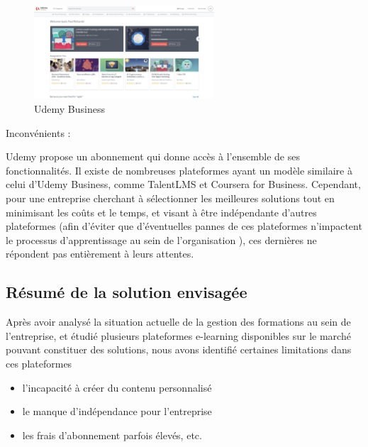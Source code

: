 \documentclass{article}
\begin{document}
\vspace{0.3cm}

\begin{figure}[H]
  \centering
  \includegraphics[width=0.6\textwidth]{udemy-business.jpg}
  \caption{Udemy Business}
  \label{fig:Udemy-Business}
\end{figure}

\vspace{0.3cm}

\noindent Inconvénients :

\vspace{0.3cm}

Udemy propose un abonnement qui donne accès à l'ensemble de ses fonctionnalités. Il existe de nombreuses plateformes ayant un modèle similaire à celui d'Udemy Business, comme TalentLMS et Coursera for Business. Cependant, pour une entreprise cherchant à sélectionner les meilleures solutions tout en minimisant les coûts et le temps, et visant à être indépendante d'autres plateformes (afin d'éviter que d'éventuelles pannes de ces plateformes n'impactent le processus d'apprentissage au sein de l'organisation ), ces dernières ne répondent pas entièrement à leurs attentes.


\subsection{Résumé de la solution envisagée}

\vspace{0.5cm}

\hspace*{2em}Après avoir analysé la situation actuelle de la gestion des formations au sein de l’entreprise, et étudié plusieurs plateformes e-learning disponibles sur le marché pouvant constituer des solutions, nous avons identifié certaines limitations dans ces plateformes
\begin{itemize}
    \item l’incapacité à créer du contenu personnalisé
    \item le manque d’indépendance pour l’entreprise
    \item les frais d’abonnement parfois élevés, etc.
\end{itemize}
\end{document}
